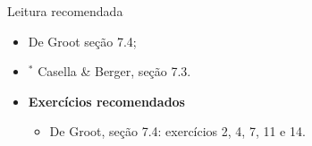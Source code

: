 \begin{frame}{Leitura recomendada}
\begin{itemize}
 \item[\faBook] De Groot seção 7.4;
 \item[\faBook] $^\ast$ Casella \& Berger, seção 7.3.
 \item {\large\textbf{Exercícios recomendados}}
 \begin{itemize}
  \item[\faBookmark] De Groot, seção 7.4: exercícios 2, 4, 7, 11 e 14.
  \end{itemize}
 \end{itemize} 
\end{frame}


